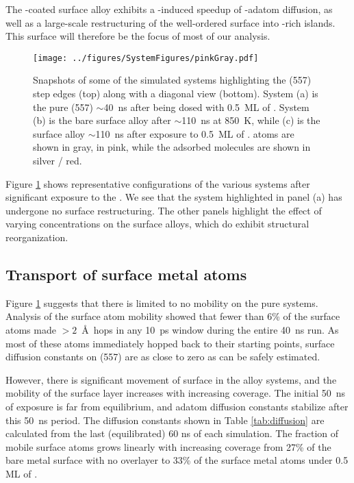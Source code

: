 \documentclass[journal = jpccck, manuscript = article]{achemso}
\begin{document}
The -coated  surface alloy exhibits a -induced
speedup of -adatom diffusion, as well as a large-scale
restructuring of the well-ordered surface into -rich islands.
This surface will therefore be the focus of most of our analysis.

\begin{figure}
  \texttt{[image: ../figures/SystemFigures/pinkGray.pdf]}
  \caption{Snapshots of some of the simulated systems highlighting the
    (557) step edges (top) along with a diagonal view (bottom).
    System (a) is the pure  (557) $\sim$40~ns after being dosed
    with 0.5~ML of .  System (b) is the bare surface alloy
    after $\sim$110~ns at 850~K, while (c) is the surface alloy
    $\sim$110~ns after exposure to 0.5~ML of .   atoms
    are shown in gray,  in pink, while the adsorbed 
    molecules are shown in silver / red.}
\label{fig:systems}
\end{figure}

Figure \ref{fig:systems} shows representative configurations of the
various systems after significant exposure to the . We see that
the  system highlighted in panel (a) has undergone no surface
restructuring. The other panels highlight the effect of varying
 concentrations on the surface alloys, which do exhibit
structural reorganization.

\subsection{Transport of surface metal atoms}

Figure \ref{fig:systems} suggests that there is limited to no mobility
on the pure  systems. Analysis of the surface atom mobility
showed that fewer than 6\% of the surface  atoms made $> 2$~\AA\
hops in any 10~ps window during the entire 40~ns run. As most of these
atoms immediately hopped back to their starting points, surface
diffusion constants on (557) are as close to zero as can be
safely estimated.

However, there is significant movement of surface  in the alloy
systems, and the mobility of the surface \ce{Pt} layer increases with
increasing \ce{CO} coverage. The initial 50~ns of exposure is
far from equilibrium, and adatom diffusion constants stabilize after
this 50~ns period.  The diffusion constants shown in Table
\ref{tab:diffusion} are calculated from the last (equilibrated) 60 ns
of each simulation. The fraction of mobile surface atoms grows
linearly with increasing  coverage from 27\% of the bare metal
surface with no  overlayer to 33\% of the surface metal atoms
under 0.5 ML of \ce{CO}.
\end{document}
